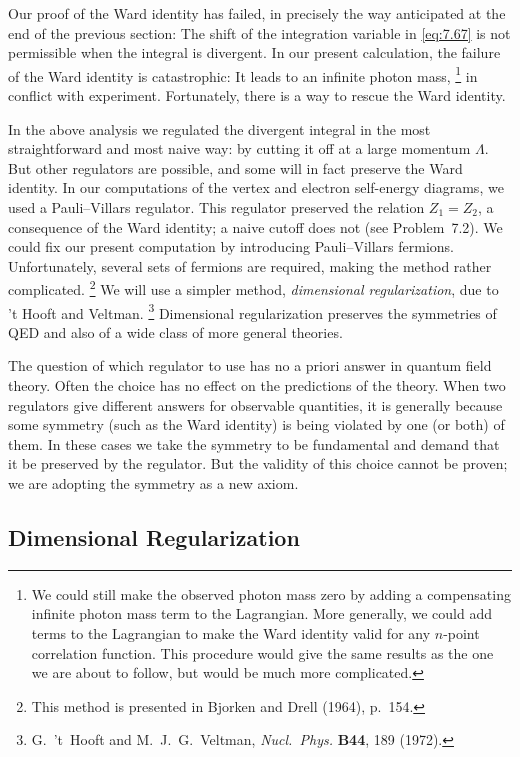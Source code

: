 Our proof of the Ward identity has failed, in precisely the way anticipated at
the end of the previous section: The shift of the integration variable in
\eqref{eq:7.67} is not permissible when the integral is divergent.  In our
present calculation, the failure of the Ward identity is catastrophic: It
leads to an infinite photon mass,%
\footnote{We could still make the observed photon mass zero by adding a
compensating infinite photon mass term to the Lagrangian.  More generally, we
could add terms to the Lagrangian to make the Ward identity valid for any
$n$-point correlation function.  This procedure would give the same results as
the one we are about to follow, but would be much more complicated.} in
conflict with experiment.  Fortunately, there is a way to rescue the Ward
identity.

In the above analysis we regulated the divergent integral in the most
straightforward and most naive way: by cutting it off at a large momentum
$\Lambda$.  But other regulators are possible, and some will in fact preserve
the Ward identity.  In our computations of the vertex and electron
self-energy diagrams, we used a Pauli--Villars regulator.  This regulator
preserved the relation $Z_1 = Z_2$, a consequence of the Ward identity; a
naive cutoff does not (see Problem~7.2).  We could fix our present
computation by introducing Pauli--Villars fermions.  Unfortunately, several
sets of fermions are required, making the method rather complicated.%
\footnote{This method is presented in Bjorken and Drell (1964), p.~154.}  We
will use a simpler method, \emph{dimensional regularization}, due to 't Hooft
and Veltman.%
\footnote{G.~'t~Hooft and M.~J.~G.~Veltman, \emph{Nucl.\ Phys.} \textbf{B44},
189 (1972).}  Dimensional regularization preserves the symmetries of QED and
also of a wide class of more general theories.

The question of which regulator to use has no a priori answer in quantum
field theory.  Often the choice has no effect on the predictions of the
theory.  When two regulators give different answers for observable
quantities, it is generally because some symmetry (such as the Ward identity)
is being violated by one (or both) of them.  In these cases we take the
symmetry to be fundamental and demand that it be preserved by the regulator.
But the validity of this choice cannot be proven; we are adopting the
symmetry as a new axiom.

\subsection{Dimensional Regularization}

